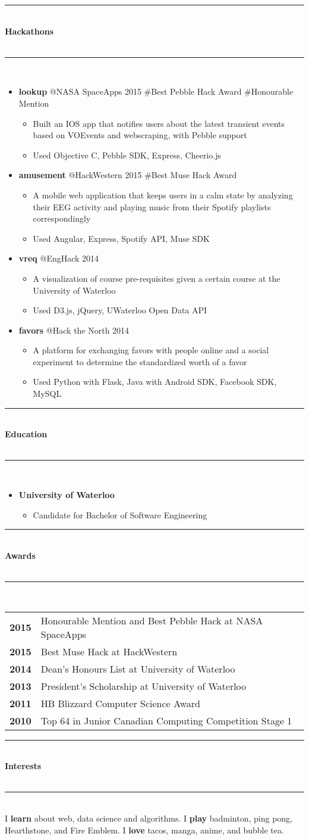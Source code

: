 \documentclass[10pt]{article}
\makeatletter
\newcommand{\cvsectiontitle}[1]{%
	\rule{\linewidth}{0.2mm}\\%
		{\large\indent\textbf{#1}}\\%
	\\[-6.5mm]\rule{\linewidth}{0.2mm}\\[2mm]%
	}
\newcommand{\cvcompany}[2]{\textbf{#1}\hspace{\stretch{3}}{#2}}
\newcommand{\cvhackathonproject}[2]{\textbf{#1} @{#2}}
\newcommand{\cvaward}[2]{\textbf{#1} & {#2}}
\newcommand{\cvsublevel}[1]{\begin{itemize}[leftmargin=0.5cm] #1\end{itemize}}
\newcommand{\cvsubbullet}[1]{\vspace{-1mm}\item #1}
\makeatother
\begin{document}
\cvsectiontitle{Hackathons}
\vspace{-0.8cm}
\begin{itemize}[leftmargin=0.5cm]
\item \cvhackathonproject{lookup}{NASA SpaceApps 2015 \#Best Pebble Hack Award \#Honourable Mention}\cvsublevel{
	\cvsubbullet{Built an IOS app that notifies users about the latest transient events based on VOEvents and webscraping, with Pebble support}
	\cvsubbullet{Used Objective C, Pebble SDK, Express, Cheerio.js}
}
\item \cvhackathonproject{amusement}{HackWestern 2015 \#Best Muse Hack Award}\cvsublevel{
	\cvsubbullet{A mobile web application that keeps users in a calm state by analyzing their EEG activity and playing music from their Spotify playlists correspondingly}
	\cvsubbullet{Used Angular, Express, Spotify API, Muse SDK}
}
\item \cvhackathonproject{vreq}{EngHack 2014}\cvsublevel{
	\cvsubbullet{A visualization of course pre-requisites given a certain course at the University of Waterloo}
	\cvsubbullet{Used D3.js, jQuery, UWaterloo Open Data API}
}
\item \cvhackathonproject{favors}{Hack the North 2014}\cvsublevel{
	\cvsubbullet{A platform for exchanging favors with people online and a social experiment to determine the standardized worth of a favor}
	\cvsubbullet{Used Python with Flask, Java with Android SDK, Facebook SDK, MySQL}
}
\end{itemize}

\vspace{-2.5mm}
\cvsectiontitle{Education}
\vspace{-0.8cm}
\begin{itemize}[leftmargin=0.5cm]
\item \cvcompany{University of Waterloo}{September 2013 - May 2018}\cvsublevel{
	\cvsubbullet{Candidate for Bachelor of Software Engineering}
}
\end{itemize}

\vspace{-2.5mm}
\cvsectiontitle{Awards}
\begin{tabular}{ c l }
	\cvaward{2015}{Honourable Mention and Best Pebble Hack at NASA SpaceApps} \\
	\cvaward{2015}{Best Muse Hack at HackWestern} \\
	\cvaward{2014}{Dean's Honours List at University of Waterloo} \\
	\cvaward{2013}{President's Scholarship at University of Waterloo} \\
	\cvaward{2011}{HB Blizzard Computer Science Award} \\
	\cvaward{2010}{Top 64 in Junior Canadian Computing Competition Stage 1}
\end{tabular}

\vspace{2mm}
\cvsectiontitle{Interests}
I \textbf{learn} about web, data science and algorithms.
I \textbf{play} badminton, ping pong, Hearthstone, and Fire Emblem.
I \textbf{love} tacos, manga, anime, and bubble tea.
\end{document}
